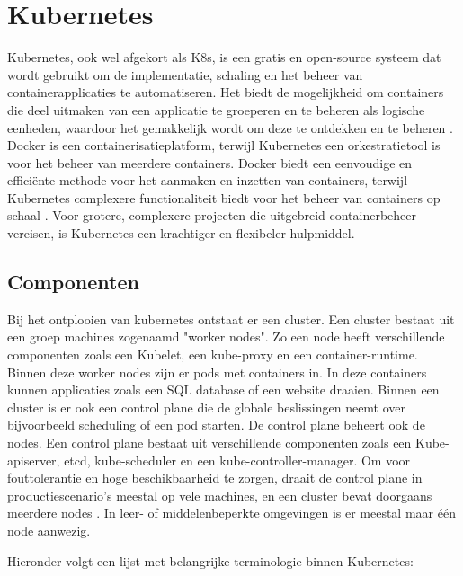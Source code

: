 \section{Kubernetes}
Kubernetes, ook wel afgekort als K8s, is een gratis en open-source systeem dat wordt gebruikt om de implementatie, schaling en het beheer van containerapplicaties te automatiseren. 
Het biedt de mogelijkheid om containers die deel uitmaken van een applicatie te groeperen en te beheren als logische eenheden, waardoor het gemakkelijk wordt om deze te ontdekken en te beheren \autocite{KubernetesDocs-2023}.
Docker is een containerisatieplatform, terwijl Kubernetes een orkestratietool is voor het beheer van meerdere containers.
Docker biedt een eenvoudige en efficiënte methode voor het aanmaken en inzetten van containers, terwijl Kubernetes complexere functionaliteit biedt voor het beheer van containers op schaal \autocite{banerjee-2023}.
Voor grotere, complexere projecten die uitgebreid containerbeheer vereisen, is Kubernetes een krachtiger en flexibeler hulpmiddel.

\subsection{Componenten}
\autocite{KubernetesDocs-2023} Bij het ontplooien van kubernetes ontstaat er een cluster. Een cluster bestaat uit een groep machines zogenaamd "worker nodes". Zo een node heeft verschillende componenten zoals een Kubelet, een kube-proxy en een container-runtime.
Binnen deze worker nodes zijn er pods met containers in. In deze containers kunnen applicaties zoals een SQL database of een website draaien. 
\autocite{KubernetesDocs-2023} Binnen een cluster is er ook een control plane die de globale beslissingen neemt over bijvoorbeeld scheduling of een pod starten. De control plane beheert ook de nodes. 
\autocite{KubernetesDocs-2023} Een control plane bestaat uit verschillende componenten zoals een Kube-apiserver, etcd, kube-scheduler en een kube-controller-manager.
Om voor fouttolerantie en hoge beschikbaarheid te zorgen, draait de control plane in productiescenario's meestal op vele machines, en een cluster bevat doorgaans meerdere nodes \autocite{KubernetesDocs-2023}. 
In leer- of middelenbeperkte omgevingen is er meestal maar één node aanwezig.

Hieronder volgt een lijst met belangrijke terminologie binnen Kubernetes:

